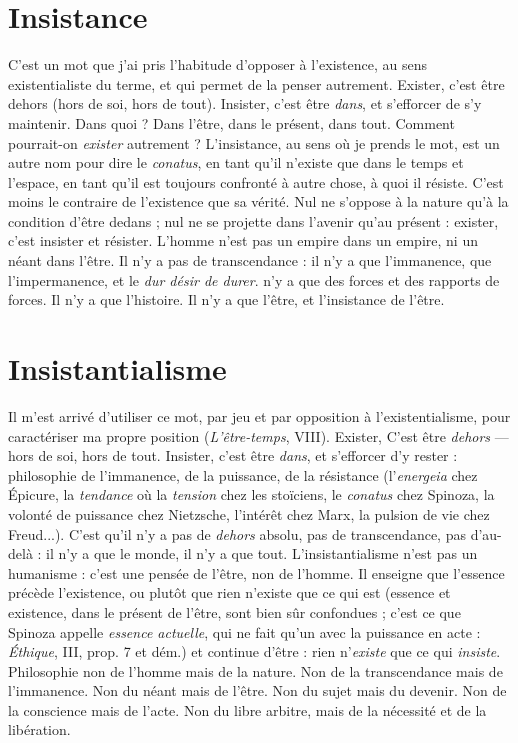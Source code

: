 \section{Insistance}
C’est un mot que j'ai pris l’habitude d’opposer à l'existence,
au sens existentialiste du terme, et qui permet de la penser
autrement. Exister, c’est être dehors (hors de soi, hors de tout). Insister, c’est
être {\it dans}, et s’efforcer de s’y maintenir. Dans quoi ? Dans l’être, dans le présent,
dans tout. Comment pourrait-on {\it exister} autrement ? L’insistance, au sens
où je prends le mot, est un autre nom pour dire le {\it conatus}, en tant qu’il n'existe
que dans le temps et l’espace, en tant qu’il est toujours confronté à autre chose,
à quoi il résiste. C’est moins le contraire de l'existence que sa vérité. Nul ne
s'oppose à la nature qu’à la condition d’être dedans ; nul ne se projette dans
l'avenir qu’au présent : exister, c’est insister et résister. L’homme n’est pas un
empire dans un empire, ni un néant dans l’être. Il n’y a pas de transcendance :
il n’y a que l’immanence, que l’impermanence, et le {\it dur désir de durer}. n’y a
que des forces et des rapports de forces. Il n’y a que l’histoire. Il n’y a que l'être,
et l’insistance de l’être.

\section{Insistantialisme}
Il m'est arrivé d’utiliser ce mot, par jeu et par opposition
à l’existentialisme, pour caractériser ma propre
position ({\it L'être-temps}, VIII). Exister, C’est être {\it dehors} — hors de soi, hors de
tout. Insister, c’est être {\it dans}, et s’efforcer d’y rester : philosophie de l’immanence,
de la puissance, de la résistance (l’{\it energeia} chez Épicure, la {\it tendance} où
la {\it tension} chez les stoïciens, le {\it conatus} chez Spinoza, la volonté de puissance
chez Nietzsche, l'intérêt chez Marx, la pulsion de vie chez Freud...). C’est qu’il
n’y a pas de {\it dehors} absolu, pas de transcendance, pas d’au-delà : il n’y a que le
monde, il n’y a que tout. L’insistantialisme n’est pas un humanisme : c’est une
pensée de l’être, non de l’homme. Il enseigne que l’essence précède l'existence,
ou plutôt que rien n'existe que ce qui est (essence et existence, dans le présent
de l'être, sont bien sûr confondues ; c’est ce que Spinoza appelle {\it essence
actuelle}, qui ne fait qu’un avec la puissance en acte : {\it Éthique}, III, prop. 7 et
dém.) et continue d’être : rien n'{\it existe} que ce qui {\it insiste}. Philosophie non de
l'homme mais de la nature. Non de la transcendance mais de l’immanence.
Non du néant mais de l’être. Non du sujet mais du devenir. Non de la conscience
mais de l’acte. Non du libre arbitre, mais de la nécessité et de la libération.

